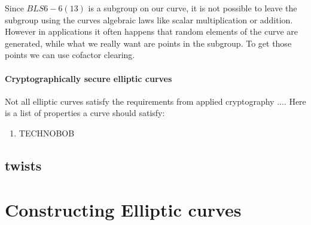 \begin{definition}
Since $BLS6-6(13)$ is a subgroup on our curve, it is not possible to leave the subgroup using the curves algebraic laws like scalar multiplication or addition. However in applications it often happens that random elements of the curve are generated, while what we really want are points in the subgroup. To get those points we can use cofactor clearing.
\end{definition}

\paragraph{Cryptographically secure elliptic curves} Not all elliptic curves satisfy the requirements from applied cryptography .... Here is a list of properties a curve should satisfy:

\begin{enumerate}
\item TECHNOBOB
\end{enumerate}

\subsection{twists}

\section{Constructing Elliptic curves}
